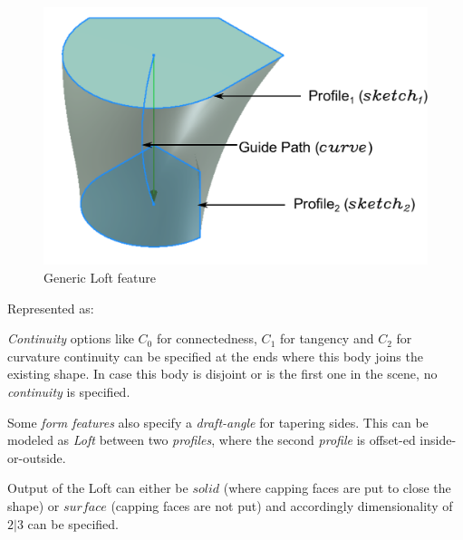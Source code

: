 \begin{figure}[h]

	\includegraphics[scale=0.35]{../Common/images//LoftPreview.pdf} 

\caption{Generic Loft feature}
\label{figure_Loft}
\end{figure}

Represented as:

{\em Continuity} options like $C_0$ for connectedness, $C_1$ for tangency and $C_2$ for curvature continuity can be specified at the ends where this body joins the existing shape. 
In case this body is disjoint or is the first one in the scene, no {\em continuity}  is specified. 

Some {\em form features} also specify a {\em draft-angle}  for tapering sides. This can be modeled as {\em Loft} between two {\em profiles}, where the second {\em profile} is offset-ed inside-or-outside. 

Output of the Loft can either be $solid$ (where capping faces are put to close the shape) or $surface$ (capping faces are not put) and accordingly dimensionality of $2|3$ can be specified.


